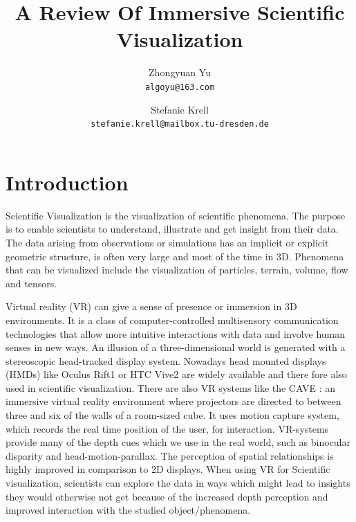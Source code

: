 \documentclass[10pt,twocolumn,letterpaper]{article}
\begin{document}
\title{A Review Of Immersive Scientific Visualization}

\author{Zhongyuan Yu\\
{\tt\small algoyu@163.com}
\and
Stefanie Krell\\
{\tt\small stefanie.krell@mailbox.tu-dresden.de}
}

\maketitle


\section{Introduction}
Scientific Visualization is the visualization of scientific phenomena. The purpose is to enable scientists to understand, illustrate and get insight from their data. The data arising from observations or simulations has an implicit or explicit geometric structure, is often very large and most of the time in 3D. Phenomena that can be visualized include the visualization of particles, terrain, volume, flow and tensors.

\setlength{\parindent}{1pc}Virtual reality (VR) can give a sense of presence or immersion in 3D environments. It is a class of computer-controlled multisensory communication technologies that allow more intuitive interactions with data and involve human senses in new ways. An illusion of a three-dimensional world is generated with a stereoscopic head-tracked display system. Nowadays head mounted displays (HMDs) like Oculus Rift1 or HTC Vive2 are widely available and there fore also used in scientific visualization. There are also VR systems like the CAVE \cite{cruz1992cave}: an immersive virtual reality environment where projectors are directed to between three and six of the walls of a room-sized cube. It uses motion capture system, which records the real time position of the user, for interaction. VR-systems provide many of the depth cues which we use in the real world, such as binocular disparity and head-motion-parallax. The perception of spatial relationships is highly improved in comparison to 2D displays. When using VR for Scientific visualization, scientists can explore the data in ways which might lead to insights they would otherwise not get because of the increased depth perception and improved interaction with the studied object/phenomena. 
\end{document}
